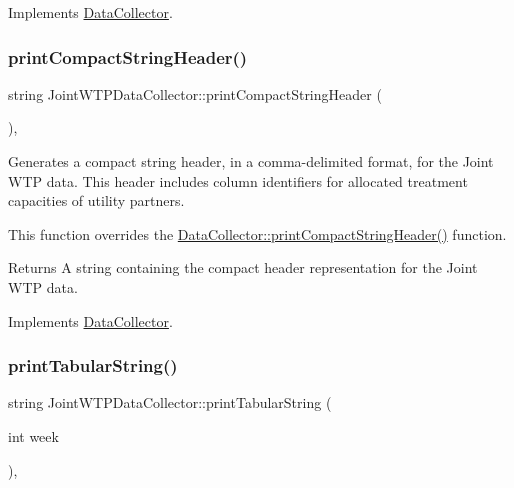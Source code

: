 Implements \mbox{\hyperlink{classDataCollector_a2eac264fa5612aed5a830b12de4f4ae3}{Data\+Collector}}.

\mbox{\label{classJointWTPDataCollector_a42bacc8ab8cc78e38715966c8dbe8de9}} 
\subsubsection{\texorpdfstring{print\+Compact\+String\+Header()}{printCompactStringHeader()}}
{\footnotesize\ttfamily string Joint\+W\+T\+P\+Data\+Collector\+::print\+Compact\+String\+Header (\begin{DoxyParamCaption}{ }\end{DoxyParamCaption})\hspace{0.3cm}{\ttfamily [override]}, {\ttfamily [virtual]}}



Generates a compact string header, in a comma-\/delimited format, for the Joint W\+TP data. This header includes column identifiers for allocated treatment capacities of utility partners. 

This function overrides the \mbox{\hyperlink{classDataCollector_a98dcb4ec871d9c7fbf7545c64e5ccc67}{Data\+Collector\+::print\+Compact\+String\+Header()}} function.

\begin{DoxyReturn}{Returns}
A string containing the compact header representation for the Joint W\+TP data. 
\end{DoxyReturn}


Implements \mbox{\hyperlink{classDataCollector_a98dcb4ec871d9c7fbf7545c64e5ccc67}{Data\+Collector}}.

\mbox{\label{classJointWTPDataCollector_a9159c0e5c58ceb8b9bf86f01b53ecdef}} 
\subsubsection{\texorpdfstring{print\+Tabular\+String()}{printTabularString()}}
{\footnotesize\ttfamily string Joint\+W\+T\+P\+Data\+Collector\+::print\+Tabular\+String (\begin{DoxyParamCaption}\item[{int}]{week }\end{DoxyParamCaption})\hspace{0.3cm}{\ttfamily [override]}, {\ttfamily [virtual]}}



